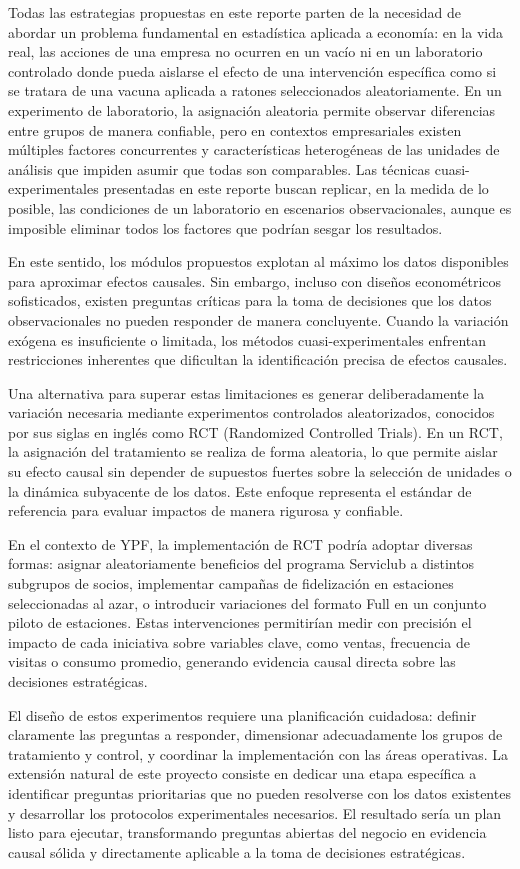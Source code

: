 Todas las estrategias propuestas en este reporte parten de la necesidad de abordar un problema fundamental en estadística aplicada a economía: en la vida real, las acciones de una empresa no ocurren en un vacío ni en un laboratorio controlado donde pueda aislarse el efecto de una intervención específica como si se tratara de una vacuna aplicada a ratones seleccionados aleatoriamente. En un experimento de laboratorio, la asignación aleatoria permite observar diferencias entre grupos de manera confiable, pero en contextos empresariales existen múltiples factores concurrentes y características heterogéneas de las unidades de análisis que impiden asumir que todas son comparables. Las técnicas cuasi-experimentales presentadas en este reporte buscan replicar, en la medida de lo posible, las condiciones de un laboratorio en escenarios observacionales, aunque es imposible eliminar todos los factores que podrían sesgar los resultados.

En este sentido, los módulos propuestos explotan al máximo los datos disponibles para aproximar efectos causales. Sin embargo, incluso con diseños econométricos sofisticados, existen preguntas críticas para la toma de decisiones que los datos observacionales no pueden responder de manera concluyente. Cuando la variación exógena es insuficiente o limitada, los métodos cuasi-experimentales enfrentan restricciones inherentes que dificultan la identificación precisa de efectos causales.

Una alternativa para superar estas limitaciones es generar deliberadamente la variación necesaria mediante experimentos controlados aleatorizados, conocidos por sus siglas en inglés como RCT (Randomized Controlled Trials). En un RCT, la asignación del tratamiento se realiza de forma aleatoria, lo que permite aislar su efecto causal sin depender de supuestos fuertes sobre la selección de unidades o la dinámica subyacente de los datos. Este enfoque representa el estándar de referencia para evaluar impactos de manera rigurosa y confiable.

En el contexto de YPF, la implementación de RCT podría adoptar diversas formas: asignar aleatoriamente beneficios del programa Serviclub a distintos subgrupos de socios, implementar campañas de fidelización en estaciones seleccionadas al azar, o introducir variaciones del formato Full en un conjunto piloto de estaciones. Estas intervenciones permitirían medir con precisión el impacto de cada iniciativa sobre variables clave, como ventas, frecuencia de visitas o consumo promedio, generando evidencia causal directa sobre las decisiones estratégicas.

El diseño de estos experimentos requiere una planificación cuidadosa: definir claramente las preguntas a responder, dimensionar adecuadamente los grupos de tratamiento y control, y coordinar la implementación con las áreas operativas. La extensión natural de este proyecto consiste en dedicar una etapa específica a identificar preguntas prioritarias que no pueden resolverse con los datos existentes y desarrollar los protocolos experimentales necesarios. El resultado sería un plan listo para ejecutar, transformando preguntas abiertas del negocio en evidencia causal sólida y directamente aplicable a la toma de decisiones estratégicas.


